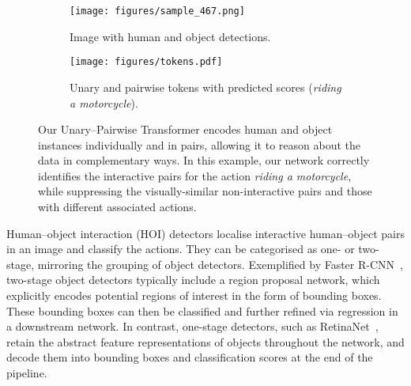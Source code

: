 \documentclass[10pt,twocolumn,letterpaper]{article}
\begin{document}
\begin{figure}[t]
    \begin{subfigure}[t]{\linewidth}
    \centering
    \texttt{[image: figures/sample\_467.png]}
    \caption{Image with human and object detections.}
    \label{fig:teaser-sample}
\end{subfigure}
\begin{subfigure}[t]{\linewidth}
    \centering
    \texttt{[image: figures/tokens.pdf]}
    \caption{Unary and pairwise tokens with predicted scores (\emph{riding a motorcycle}).}
    \label{fig:teaser-tokens}
\end{subfigure}
\caption{Our Unary--Pairwise Transformer encodes human and object instances individually and in pairs, allowing it to reason about the data in complementary ways. In this example, our network correctly identifies the interactive pairs for the action \textit{riding a motorcycle}, while suppressing the visually-similar non-interactive pairs and those with different associated actions.
}
\label{fig:teaser}
\vspace{-10pt}
\end{figure}

Human--object interaction (HOI) detectors localise interactive human--object pairs in an image and classify the actions. They can be categorised as one- or two-stage, mirroring the grouping of object detectors.
Exemplified by Faster R-CNN~\cite{fasterrcnn}, two-stage object detectors typically include a region proposal network, which explicitly encodes potential regions of interest in the form of bounding boxes. These bounding boxes can then be classified and further refined via regression in a downstream network. In contrast, one-stage detectors, such as RetinaNet~\cite{retinanet}, retain the abstract feature representations of objects throughout the network, and decode them into bounding boxes and classification scores at the end of the pipeline.
\end{document}
